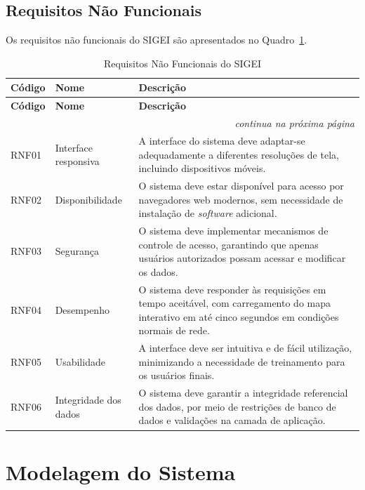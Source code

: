 \documentclass[12pt,a4paper,oneside]{abntspiifac}
\begin{document}
\subsection{Requisitos Não Funcionais}

Os requisitos não funcionais do SIGEI são apresentados no Quadro~\ref{qua:rnf}.

\begin{longtable}{p{1.5cm}p{4cm}p{8cm}}
\caption{Requisitos Não Funcionais do SIGEI}
\label{qua:rnf} \\
\toprule
\textbf{Código} & \textbf{Nome} & \textbf{Descrição} \\
\midrule
\endfirsthead
\toprule
\textbf{Código} & \textbf{Nome} & \textbf{Descrição} \\
\midrule
\endhead
\midrule
\multicolumn{3}{r}{\small\textit{continua na próxima página}} \\
\endfoot
\bottomrule
\endlastfoot
RNF01 & Interface responsiva    & A interface do sistema deve adaptar-se adequadamente a diferentes resoluções de tela, incluindo dispositivos móveis. \\[4pt]
RNF02 & Disponibilidade         & O sistema deve estar disponível para acesso por navegadores web modernos, sem necessidade de instalação de \textit{software} adicional. \\[4pt]
RNF03 & Segurança               & O sistema deve implementar mecanismos de controle de acesso, garantindo que apenas usuários autorizados possam acessar e modificar os dados. \\[4pt]
RNF04 & Desempenho              & O sistema deve responder às requisições em tempo aceitável, com carregamento do mapa interativo em até cinco segundos em condições normais de rede. \\[4pt]
RNF05 & Usabilidade             & A interface deve ser intuitiva e de fácil utilização, minimizando a necessidade de treinamento para os usuários finais. \\[4pt]
RNF06 & Integridade dos dados   & O sistema deve garantir a integridade referencial dos dados, por meio de restrições de banco de dados e validações na camada de aplicação. \\
\end{longtable}

\section{Modelagem do Sistema}
\end{document}
